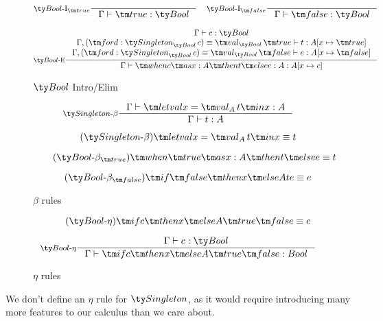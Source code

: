 \begin{figure*}[h]
  \[
  \inference[\Intro{$\Bool$}$_{\true}$]{}
            {\Gamma \vdash \true : \Bool}
  \quad
  \inference[\Intro{$\Bool$}$_{\false}$]{}
            {\Gamma \vdash \false : \Bool}
  \]

  \[
  \inference[\Elim{$\Bool$}]
            {\Gamma \vdash c : \Bool
            \\ \Gamma, (\ford : \Singleton[\Bool][c]) \equiv \val[\Bool][\true] \vdash t : A[x \mapsto \true]
            \\ \Gamma, (\ford : \Singleton[\Bool][c]) \equiv \val[\Bool][\false] \vdash e : A[x \mapsto \false]
            }
            {\Gamma \vdash \when c x A t e : A : A[x \mapsto c]}
  \]

  \caption*{$\Bool$ Intro/Elim}
  \label{fig:dt-singletons-bool-intro-elim}
\end{figure*}




\begin{figure*}[h]
  \[
  \inference[$\Singleton$-$\beta$]
            { \Gamma \vdash \letval x {\val[A][t]} x : A
            }
            {\Gamma \vdash t : A}
  \]

  \begin{equation}
    \tag{$\Singleton$-$\beta$}
    \letval x {\val[A][t]} x \equiv t
  \end{equation}

  \begin{equation}
    \tag{$\Bool$-$\beta_{\true}$}
    \when \true x A t e \equiv t
  \end{equation}

  \begin{equation}
    \tag{$\Bool$-$\beta_{\false}$}
    \ite \false x A t e \equiv e
  \end{equation}

  \caption*{$\beta$ rules}
  \label{fig:dt-singletons-beta}
\end{figure*}

\begin{figure*}[h]
  \begin{equation}
    \tag{$\Bool$-$\eta$}
    \ite c x A \true \false \equiv c
  \end{equation}

  \[
  \inference[$\Bool$-$\eta$]
            { \Gamma \vdash c : \Bool}
            {\Gamma \vdash \ite c x A \true \false : Bool}
  \]

  \caption*{$\eta$ rules}
  \label{fig:dt-singletons-eta}
\end{figure*}

We don't define an $\eta$ rule for $\Singleton$, as it would require introducing many more features to our calculus than we care about.
